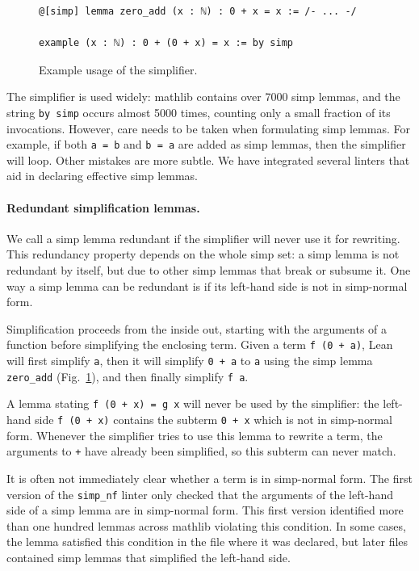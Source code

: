 \documentclass[runningheads]{llncs}
\newcommand{\mathlib}{\textsf{mathlib}\xspace}
\newcommand{\lean}[1]{\lstinline[language=lean]{#1}}
\begin{document}
\begin{figure}[t]
\begin{lstlisting}
@[simp] lemma zero_add (x : ℕ) : 0 + x = x := /- ... -/

example (x : ℕ) : 0 + (0 + x) = x := by simp
\end{lstlisting}
\caption{Example usage of the simplifier.
}
\label{figure:simp-example}
\end{figure}

The simplifier is used widely:
\mathlib contains over 7000 simp lemmas, %
and the string \lean{by simp} occurs almost 5000 times,
counting only a small fraction of its invocations.
However, care needs to be taken when formulating simp lemmas.
For example,
if both \lean{a = b} and \lean{b = a} are added as simp lemmas,
then the simplifier will loop. %
Other mistakes are more subtle.
We have integrated several linters
that aid in declaring effective simp lemmas.

\paragraph{Redundant simplification lemmas.}
We call a simp lemma redundant
if the simplifier will never use it for rewriting.
This redundancy property depends on the whole simp set:
a simp lemma is not redundant by itself,
but due to other simp lemmas that
break or subsume it.
One way a simp lemma can be redundant is
if its left-hand side is not in simp-normal form.

Simplification proceeds from the inside out,
starting with the arguments of a function before simplifying the enclosing term.
Given a term \lean{f (0 + a)},
Lean will first simplify \lean{a},
then it will simplify \lean{0 + a} to \lean{a}
using the simp lemma \lean{zero_add} (Fig.~\ref{figure:simp-example}),
and then finally simplify \lean{f a}.

A lemma stating \lean{f (0 + x) = g x} will never be used by the simplifier:
the left-hand side \lean{f (0 + x)} contains the subterm \lean{0 + x}
which is not in simp-normal form.
Whenever the simplifier tries to use this lemma to rewrite a term,
the arguments to \lean{+} have already been simplified,
so this subterm can never match.

It is often not immediately clear
whether a term is in simp-normal form.
The first version of the \lean{simp_nf} linter only checked
that the arguments of the left-hand side of a simp lemma
are in simp-normal form.
This first version identified more than one hundred lemmas across \mathlib
violating this condition.
In some cases, the lemma satisfied this condition in the file where it was declared,
but later files contained simp lemmas that simplified the left-hand side.
\end{document}

